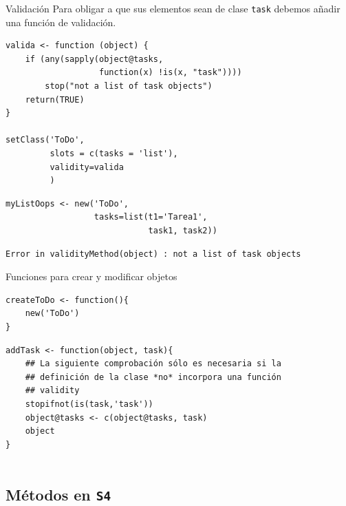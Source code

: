 \documentclass[xcolor={usenames,svgnames,dvipsnames}]{beamer}
\begin{document}
\begin{frame}[fragile,label={sec:org7016034}]{Validación}
 Para obligar a que sus elementos sean de clase \texttt{task} debemos añadir
una función de validación.
\lstset{language=r,label= ,caption= ,captionpos=b,numbers=none}
\begin{lstlisting}
valida <- function (object) {
    if (any(sapply(object@tasks,
                   function(x) !is(x, "task")))) 
        stop("not a list of task objects")
    return(TRUE)
}

setClass('ToDo',
         slots = c(tasks = 'list'),
         validity=valida
         )
\end{lstlisting}

\lstset{language=r,label= ,caption= ,captionpos=b,numbers=none}
\begin{lstlisting}
myListOops <- new('ToDo',
                  tasks=list(t1='Tarea1',
                             task1, task2))
\end{lstlisting}

\begin{verbatim}
Error in validityMethod(object) : not a list of task objects
\end{verbatim}
\end{frame}

\begin{frame}[fragile,label={sec:org4841510}]{Funciones para crear y modificar objetos}
 \lstset{language=r,label= ,caption= ,captionpos=b,numbers=none}
\begin{lstlisting}
createToDo <- function(){
    new('ToDo')
}
\end{lstlisting}

\lstset{language=r,label= ,caption= ,captionpos=b,numbers=none}
\begin{lstlisting}
addTask <- function(object, task){
    ## La siguiente comprobación sólo es necesaria si la
    ## definición de la clase *no* incorpora una función 
    ## validity
    stopifnot(is(task,'task'))
    object@tasks <- c(object@tasks, task)
    object
}
  
\end{lstlisting}
\end{frame}


\subsection{Métodos en \texttt{S4}}
\label{sec:org2a5a259}
\end{document}
